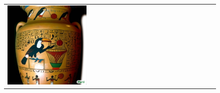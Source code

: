 \begin{figure}[ht!]
\begin{adjustwidth}{-0.8in}{-0.5in}
\begin{tabular}{cccccccccccccccccccc}
\multicolumn{2}{c}{\includegraphics[width=\threebythreecolwidth\textwidth]{figures/cherries/toucan_basketball.jpg}}\\


\end{tabular}
\end{adjustwidth}
\end{figure}
